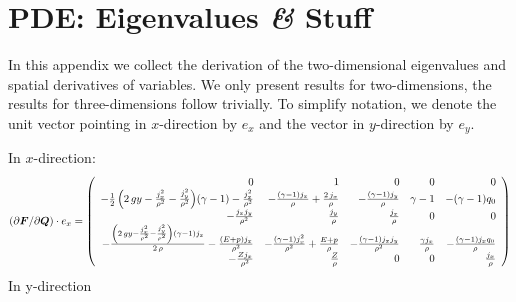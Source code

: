 \chapter{PDE: Eigenvalues \textit{\&} Stuff}
In this appendix we collect the derivation of the two-dimensional eigenvalues and spatial derivatives of variables.
We only present results for two-dimensions, the results for three-dimensions follow trivially.
To simplify notation, we denote the unit vector pointing in $x$-direction by $e_x$ and the vector in $y$-direction by $e_y$.

In $x$-direction:
\begin{equation}
\left( \partial \bm{F}/\partial \bm{Q}\right) \cdot e_x = \left(\begin{array}{rrrrr}
0 & 1 & 0 & 0 & 0 \\
-\frac{1}{2} \, {\left(2 \, g y - \frac{j_{x}^{2}}{\rho^{2}} - \frac{j_{y}^{2}}{\rho^{2}}\right)} {\left(\gamma - 1\right)} - \frac{j_{x}^{2}}{\rho^{2}} & -\frac{{\left(\gamma - 1\right)} j_{x}}{\rho} + \frac{2 \, j_{x}}{\rho} & -\frac{{\left(\gamma - 1\right)} j_{y}}{\rho} & \gamma - 1 & -{\left(\gamma - 1\right)} q_{0} \\
-\frac{j_{x} j_{y}}{\rho^{2}} & \frac{j_{y}}{\rho} & \frac{j_{x}}{\rho} & 0 & 0 \\
-\frac{{\left(2 \, g y - \frac{j_{x}^{2}}{\rho^{2}} - \frac{j_{y}^{2}}{\rho^{2}}\right)} {\left(\gamma - 1\right)} j_{x}}{2 \, \rho} - \frac{{\left(E + {p}\right)} j_{x}}{\rho^{2}} & -\frac{{\left(\gamma - 1\right)} j_{x}^{2}}{\rho^{2}} + \frac{E + {p}}{\rho} & -\frac{{\left(\gamma - 1\right)} j_{x} j_{y}}{\rho^{2}} & \frac{\gamma j_{x}}{\rho} & -\frac{{\left(\gamma - 1\right)} j_{x} q_{0}}{\rho} \\
-\frac{Z j_{x}}{\rho^{2}} & \frac{Z}{\rho} & 0 & 0 & \frac{j_{x}}{\rho}
\end{array}\right)
\end{equation}
In y-direction
